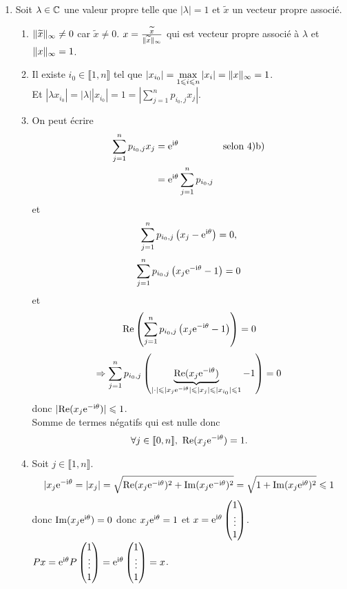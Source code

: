 \begin{solution}
\begin{enumerate}
        \item Soit $\lambda \in \mathbb{C}$ une valeur propre telle que $|\lambda| = 1$ et $\widetilde{x}$ un vecteur propre associé.
        \begin{enumerate}
            \item $\Vert \widetilde{x} \Vert_\infty \not= 0$ car $\widetilde{x} \not= 0$. 
            $x = \frac{\widetilde{x}}{\Vert \widetilde{x} \Vert_\infty}$ qui est vecteur propre associé à $\lambda$ et $\Vert x \Vert_\infty = 1$.
            \item Il existe $i_0 \in \llbracket 1, n \rrbracket$ tel que $|x_{i_0}| = \max\limits_{1 \leqslant i \leqslant n} |x_i| = \Vert x \Vert_\infty = 1$. \\
            Et $|\lambda x_{i_0}| = |\lambda||x_{i_0}| = 1 = \left| \sum\limits_{j=1}^n p_{i_0, j} x_j \right|$.
            \item On peut écrire
            \begin{align*}
                \sum_{j=1}^n p_{i_0, j} x_j &= \mathrm{e}^{\mathrm{i} \theta} & \text{selon 4)b)} \\
                &= \mathrm{e}^{\mathrm{i} \theta} \sum_{j=1}^n p_{i_0, j} &
            \end{align*}
            et
            $$\sum_{j=1}^n p_{i_0, j} \left( x_j - \mathrm{e}^{\mathrm{i} \theta} \right) = 0,$$
            $$\sum_{j=1}^n p_{i_0, j} \left( x_j \mathrm{e}^{-\mathrm{i} \theta} - 1 \right) = 0$$
            et
            $$\mathrm{Re} \left( \sum_{j=1}^n p_{i_0, j} \left( x_j \mathrm{e}^{- \mathrm{i} \theta} - 1 \right) \right) = 0$$
            $$\Rightarrow \sum_{j=1}^n p_{i_0, j} \left( \underbrace{\mathrm{Re}(x_j \mathrm{e}^{- \mathrm{i} \theta})}_{|\cdot| \leqslant |x_j \mathrm{e}^{-\mathrm{i} \theta}| \leqslant |x_j| \leqslant |x_{i_0}| \leqslant 1} - 1 \right) = 0$$
            donc $|\mathrm{Re}(x_j \mathrm{e}^{- \mathrm{i} \theta}) | \leqslant 1$. \\
            Somme de termes négatifs qui est nulle donc
            $$\forall j \in \llbracket 0, n \rrbracket,\ \Reel(x_j \me^{- \mi \theta}) = 1.$$
            \item Soit $j \in \llbracket 1, n \rrbracket$.
            $$|x_j \mathrm{e}^{-\mathrm{i} \theta} = |x_j| = \sqrt{ \mathrm{Re} (x_j \mathrm{e}^{- \mathrm{i} \theta})^2 + \Im(x_j \mathrm{e}^{- \mathrm{i} \theta})^2 } = \sqrt{1 + \Im(x_j \mathrm{e}^{\mathrm{i} \theta})^2} \leqslant 1$$
            donc $\Im(x_j \mathrm{e}^{\mathrm{i} \theta}) = 0$ donc $x_j \mathrm{e}^{\mathrm{i} \theta} = 1$ et $x = \mathrm{e}^{\mathrm{i} \theta} \begin{pmatrix}1 \\ \vdots \\ 1\end{pmatrix}$. $Px = \mathrm{e}^{\mathrm{i} \theta} P \begin{pmatrix}1 \\ \vdots \\ 1\end{pmatrix} = \mathrm{e}^{\mathrm{i} \theta} \begin{pmatrix}1 \\ \vdots \\ 1\end{pmatrix} = x$. 
        \end{enumerate}
    \end{enumerate}
\end{solution}
